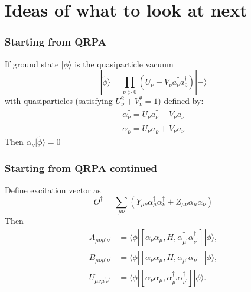 \section{Ideas of what to look at next}
\begin{frame}
\frametitle{Starting from QRPA}
If ground state $|\phi\rangle$ is the quasiparticle vacuum 
\begin{equation}
|\tilde{\phi}\rangle=\prod_{\nu>0}\left(U_\nu+V_\nu a_\nu^{\dagger} a_{\overline{\nu}}^{\dagger}\right)|-\rangle
\end{equation}
with quasiparticles (satisfying $U_\nu^2+V_\nu^2=1$) defined by: 
\begin{align}
    \alpha_\nu^{\dagger}=U_\nu a_\nu^{\dagger}-V_\nu a_{\bar{\nu}} \\
    \alpha_{\bar{\nu}}^{\dagger}=U_\nu a_{\bar{\nu}}^{\dagger}+V_\nu a_\nu
\end{align}
Then $\alpha_\nu |\tilde{\phi}\rangle=0$ 

\end{frame}

\begin{frame}
\frametitle{Starting from QRPA continued}
Define excitation vector as
\begin{equation}
    O^{\dagger}=\sum_{\mu \nu}\left(Y_{\mu \nu} \alpha_\mu^{\dagger} \alpha_\nu^{\dagger}+Z_{\mu \nu} \alpha_\mu \alpha_\nu\right)
\end{equation}
Then
\begin{align}
    A_{\mu \nu \mu^{\prime} \nu^{\prime}} &= \langle\phi|\left[\alpha_\nu \alpha_\mu, H, \alpha_{\mu^{\prime}}^{\dagger} \alpha_{\nu^{\prime}}^{\dagger}\right]|\phi\rangle, \\
    B_{\mu \nu \mu^{\prime} \nu^{\prime}} &= \langle\phi|\left[\alpha_\nu \alpha_\mu, H, \alpha_{\mu^{\prime}} \alpha_{\nu^{\prime}}\right]|\phi\rangle, \\
    U_{\mu \nu \mu^{\prime} \nu^{\prime}} &= \langle\phi|\left[\alpha_\nu \alpha_\mu, \alpha_{\mu^{\prime}}^{\dagger} \alpha_{\nu^{\prime}}^{\dagger}\right]|\phi\rangle .
\end{align}
\end{frame}

